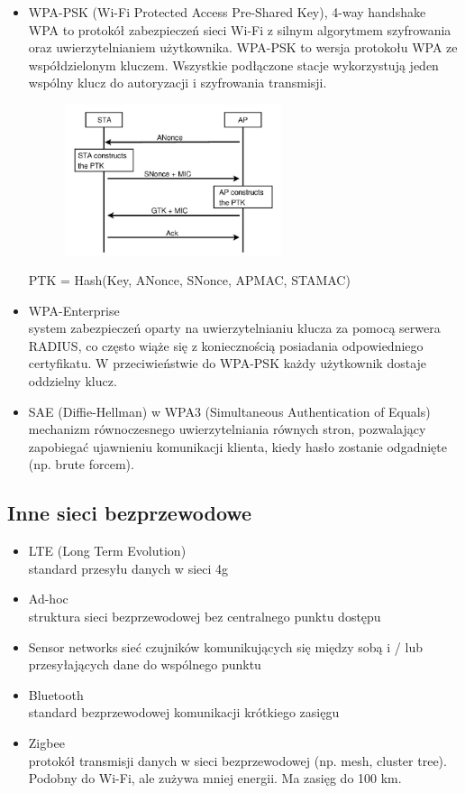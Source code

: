 \documentclass[]{article}
\begin{document}
\begin{itemize}
    \item WPA-PSK (Wi-Fi Protected Access Pre-Shared Key), 4-way handshake \\
    WPA to protokół zabezpieczeń sieci Wi-Fi z silnym algorytmem szyfrowania oraz uwierzytelnianiem użytkownika.
    WPA-PSK to wersja protokołu WPA ze współdzielonym kluczem. Wszystkie podłączone stacje wykorzystują jeden wspólny klucz do autoryzacji i szyfrowania transmisji.
    \begin{figure}[H]
        \centering
        \includegraphics[width=0.6\textwidth]{WPASK.png}
    \end{figure}
    PTK = Hash(Key, ANonce, SNonce, APMAC, STAMAC)
    \item WPA-Enterprise \\
    system zabezpieczeń oparty na uwierzytelnianiu klucza za pomocą serwera RADIUS,
    co często wiąże się z koniecznością posiadania odpowiedniego certyfikatu. W przeciwieństwie do WPA-PSK każdy użytkownik dostaje oddzielny klucz.
    \item SAE (Diffie-Hellman) w WPA3 (Simultaneous Authentication of Equals) \\
    mechanizm równoczesnego uwierzytelniania równych stron, pozwalający zapobiegać ujawnieniu komunikacji klienta, kiedy hasło zostanie odgadnięte (np. brute forcem).
\end{itemize}
\subsection{Inne sieci bezprzewodowe}
\begin{itemize}
    \item LTE (Long Term Evolution) \\
    standard przesyłu danych w sieci 4g
    \item Ad-hoc \\
    struktura sieci bezprzewodowej bez centralnego punktu dostępu
    \item Sensor networks sieć czujników komunikujących się między sobą i / lub przesyłających dane do wspólnego punktu
    \item Bluetooth \\
    standard bezprzewodowej komunikacji krótkiego zasięgu
    \item Zigbee \\
    protokół transmisji danych w sieci bezprzewodowej (np. mesh, cluster tree). Podobny do Wi-Fi, ale zużywa mniej energii. Ma zasięg do 100 km.
\end{itemize}
\end{document}
